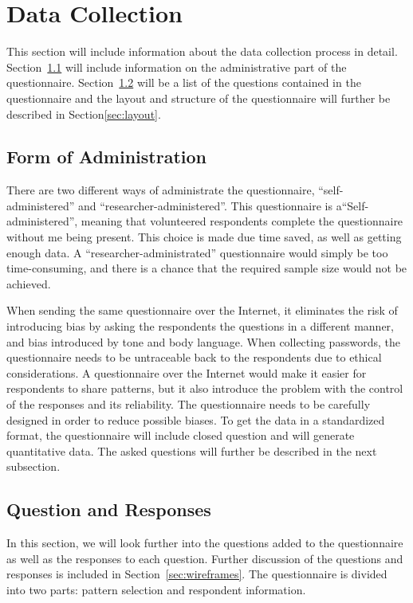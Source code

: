 \section{Data Collection} \label{sec:datacollection}
  
  This section will include information about the data collection process in detail. Section~\ref{sec:formodadministration} will include information on the administrative part of the questionnaire. Section~\ref{sec:questions} will be a list of the questions contained in the questionnaire and the layout and structure of the questionnaire will further be described in Section\ref{sec:layout}.

  \subsection{Form of Administration} \label{sec:formodadministration}

  There are two different ways of administrate the questionnaire, ``self-administered'' and ``researcher-administered''. This questionnaire is a``Self-administered'', meaning that volunteered respondents complete the questionnaire without me being present. This choice is made due time saved, as well as getting enough data. A ``researcher-administrated'' questionnaire would simply be too time-consuming, and there is a chance that the required sample size would not be achieved.

  When sending the same questionnaire over the Internet, it eliminates the risk of introducing bias by asking the respondents the questions in a different manner, and bias introduced by tone and body language. When collecting passwords, the questionnaire needs to be untraceable back to the respondents due to ethical considerations. A questionnaire over the Internet would make it easier for respondents to share patterns, but it also introduce the problem with the control of the responses and its reliability. The questionnaire needs to be carefully designed in order to reduce possible biases. To get the data in a standardized format, the questionnaire will include closed question and will generate quantitative data. The asked questions will further be described in the next subsection.

  \subsection{Question and Responses}\label{sec:questions}

  In this section, we will look further into the questions added to the questionnaire as well as the responses to each question. Further discussion of the questions and responses is included in Section~\ref{sec:wireframes}.
  The questionnaire is divided into two parts: pattern selection and respondent information. 

